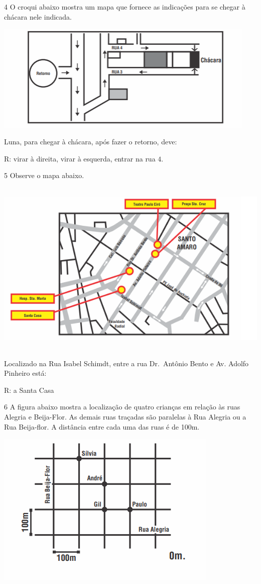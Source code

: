 \num{4}  O croqui abaixo mostra um mapa que fornece as indicações para se
chegar à chácara nele indicada.

\includegraphics[width=4.95347in,height=2.04653in]{./imgSAEB_6_MAT/media/image67.png}

Luna, para chegar à chácara, após fazer o retorno, deve:

R: virar à direita, virar à esquerda, entrar na rua $4$.

\num{5}  Observe o mapa abaixo.

\includegraphics[width=5.90625in,height=3.34375in]{./imgSAEB_6_MAT/media/image68.png}

Localizado na Rua Isabel Schimdt, entre a rua Dr.~Antônio Bento e Av.
Adolfo Pinheiro está:

R: a Santa Casa

\num{6}  A figura abaixo mostra a localização de quatro crianças em relação às
ruas Alegria e Beija-Flor. As demais ruas traçadas são paralelas à Rua
Alegria ou a Rua Beija-flor. A distância entre cada uma das ruas é de
100m.

\includegraphics[width=4.19792in,height=2.93056in]{./imgSAEB_6_MAT/media/image69.png}

